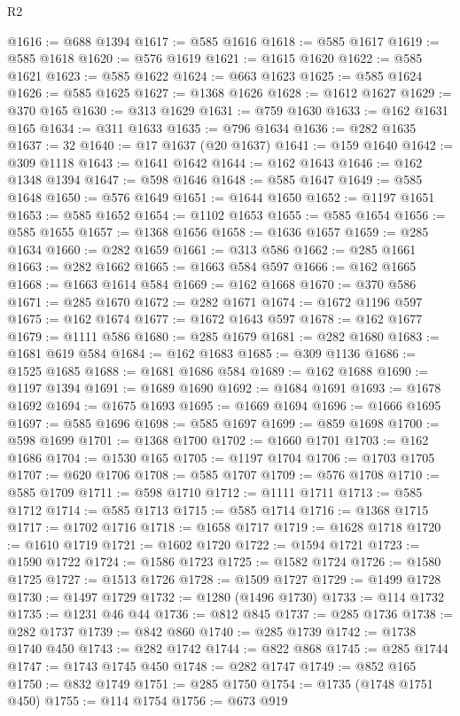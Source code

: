\begin{lexlean}{R2}
\begin{coremodule}
@1616 := @688 @1394
@1617 := @585 @1616
@1618 := @585 @1617
@1619 := @585 @1618
@1620 := @576 @1619
@1621 := @1615 @1620
@1622 := @585 @1621
@1623 := @585 @1622
@1624 := @663 @1623
@1625 := @585 @1624
@1626 := @585 @1625
@1627 := @1368 @1626
@1628 := @1612 @1627
@1629 := @370 @165
@1630 := @313 @1629
@1631 := @759 @1630
@1633 := @162 @1631 @165
@1634 := @311 @1633
@1635 := @796 @1634
@1636 := @282 @1635
@1637 := 32
@1640 := @17 @1637 (@20 @1637)
@1641 := @159 @1640
@1642 := @309 @1118
@1643 := @1641 @1642
@1644 := @162 @1643
@1646 := @162 @1348 @1394
@1647 := @598 @1646
@1648 := @585 @1647
@1649 := @585 @1648
@1650 := @576 @1649
@1651 := @1644 @1650
@1652 := @1197 @1651
@1653 := @585 @1652
@1654 := @1102 @1653
@1655 := @585 @1654
@1656 := @585 @1655
@1657 := @1368 @1656
@1658 := @1636 @1657
@1659 := @285 @1634
@1660 := @282 @1659
@1661 := @313 @586
@1662 := @285 @1661
@1663 := @282 @1662
@1665 := @1663 @584 @597
@1666 := @162 @1665
@1668 := @1663 @1614 @584
@1669 := @162 @1668
@1670 := @370 @586
@1671 := @285 @1670
@1672 := @282 @1671
@1674 := @1672 @1196 @597
@1675 := @162 @1674
@1677 := @1672 @1643 @597
@1678 := @162 @1677
@1679 := @1111 @586
@1680 := @285 @1679
@1681 := @282 @1680
@1683 := @1681 @619 @584
@1684 := @162 @1683
@1685 := @309 @1136
@1686 := @1525 @1685
@1688 := @1681 @1686 @584
@1689 := @162 @1688
@1690 := @1197 @1394
@1691 := @1689 @1690
@1692 := @1684 @1691
@1693 := @1678 @1692
@1694 := @1675 @1693
@1695 := @1669 @1694
@1696 := @1666 @1695
@1697 := @585 @1696
@1698 := @585 @1697
@1699 := @859 @1698
@1700 := @598 @1699
@1701 := @1368 @1700
@1702 := @1660 @1701
@1703 := @162 @1686
@1704 := @1530 @165
@1705 := @1197 @1704
@1706 := @1703 @1705
@1707 := @620 @1706
@1708 := @585 @1707
@1709 := @576 @1708
@1710 := @585 @1709
@1711 := @598 @1710
@1712 := @1111 @1711
@1713 := @585 @1712
@1714 := @585 @1713
@1715 := @585 @1714
@1716 := @1368 @1715
@1717 := @1702 @1716
@1718 := @1658 @1717
@1719 := @1628 @1718
@1720 := @1610 @1719
@1721 := @1602 @1720
@1722 := @1594 @1721
@1723 := @1590 @1722
@1724 := @1586 @1723
@1725 := @1582 @1724
@1726 := @1580 @1725
@1727 := @1513 @1726
@1728 := @1509 @1727
@1729 := @1499 @1728
@1730 := @1497 @1729
@1732 := @1280 (@1496 @1730)
@1733 := @114 @1732
@1735 := @1231 @46 @44
@1736 := @812 @845
@1737 := @285 @1736
@1738 := @282 @1737
@1739 := @842 @860
@1740 := @285 @1739
@1742 := @1738 @1740 @450
@1743 := @282 @1742
@1744 := @822 @868
@1745 := @285 @1744
@1747 := @1743 @1745 @450
@1748 := @282 @1747
@1749 := @852 @165
@1750 := @832 @1749
@1751 := @285 @1750
@1754 := @1735 (@1748 @1751 @450)
@1755 := @114 @1754
@1756 := @673 @919

\end{coremodule}
\end{lexlean}
